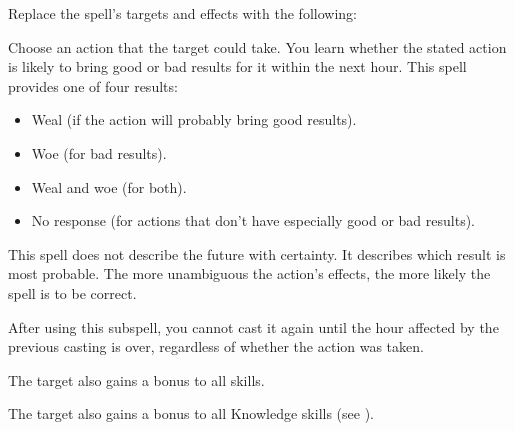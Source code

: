 Replace the spell's targets and effects with the following:
\begin{spellcontent}

\begin{augmenttargetinginfo}



\end{augmenttargetinginfo}


\begin{augmenteffects}



\spelleffect
Choose an action that the target could take.
You learn whether the stated action is likely to bring good or bad results for it within the next hour.
This spell provides one of four results:
\begin{itemize}
\item Weal (if the action will probably bring good results).
\item Woe (for bad results).
\item Weal and woe (for both).
\item No response (for actions that don't have especially good or bad results).
\end{itemize}

This spell does not describe the future with certainty.
It describes which result is most probable.
The more unambiguous the action's effects, the more likely the spell is to be correct.

After using this subspell, you cannot cast it again until the hour affected by the previous casting is over, regardless of whether the action was taken.






\end{augmenteffects}

\end{spellcontent}






The target also gains a  bonus to all skills.







The target also gains a  bonus to all Knowledge skills (see ).






